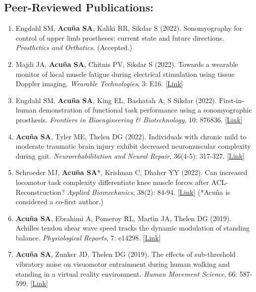\documentclass[letterpaper, 10pt]{article}
\begin{document}
\subsection{Peer-Reviewed Publications:}
\begin{enumerate}
    \item Engdahl SM, \textbf{Acuña SA}, Kaliki RR, Sikdar S (2022). Sonomyography for control of upper limb prostheses: current state and future directions. \textit{Prosthetics and Orthotics}. (Accepted.)
    \item Majdi JA, \textbf{Acuña SA}, Chitnis PV, Sikdar S (2022). Towards a wearable monitor of local muscle fatigue during electrical stimulation using tissue Doppler imaging. \textit{Wearable Technologies}, 3: E16. [\href{https://www.cambridge.org/core/journals/wearable-technologies/article/toward-a-wearable-monitor-of-local-muscle-fatigue-during-electrical-muscle-stimulation-using-tissue-doppler-imaging/4ADA49B3A98D245E222D5CCFDE1F180D}{Link}]
    \item Engdahl SM, \textbf{Acuña SA}, King EL, Bashatah A, S Sikdar (2022). First-in-human demonstration of functional task performance using a sonomyographic prosthesis. \textit{Frontiers in Bioengineering \& Biotechnology}, 10: 876836. [\href{https://www.frontiersin.org/articles/10.3389/fbioe.2022.876836/full}{Link}]
    \item \textbf{Acuña SA}, Tyler ME, Thelen DG (2022). Individuals with chronic mild to moderate traumatic brain injury exhibit decreased neuromuscular complexity during gait. \textit{Neurorehabilitation and Neural Repair}, 36(4-5): 317-327. [\href{https://journals.sagepub.com/doi/full/10.1177/15459683221081064}{Link}]
    \item Schroeder MJ, \textbf{Acuña SA}*, Krishnan C, Dhaher YY (2022). Can increased locomotor task complexity differentiate knee muscle forces after ACL-Reconstruction? \textit{Applied Biomechanics}, 38(2): 84-94. [\href{https://journals.humankinetics.com/view/journals/jab/38/2/article-p84.xml}{Link}] (*Acuña is considered a co-ﬁrst author.)
    \item \textbf{Acuña SA}, Ebrahimi A, Pomeroy RL, Martin JA, Thelen DG (2019). Achilles tendon shear wave speed tracks the dynamic modulation of standing balance. \textit{Physiological Reports}, 7: e14298. [\href{https://physoc.onlinelibrary.wiley.com/doi/full/10.14814/phy2.14298}{Link}]
    \item \textbf{Acuña SA}, Zunker JD, Thelen DG (2019). The effects of sub-threshold vibratory noise on visuomotor entrainment during human walking and standing in a virtual reality environment. \textit{Human Movement Science}, 66: 587-599. [\href{https://www.sciencedirect.com/science/article/abs/pii/S0167945719300582}{Link}]

\end{enumerate}
\end{document}
